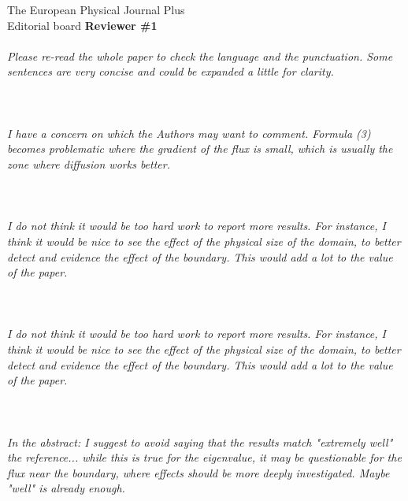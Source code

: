 \documentclass[11pt]{letter} %
\newcommand{\revised}[1]{{\color{red}{#1}}}
\begin{document}
\begin{letter}{The European Physical Journal Plus \\
Editorial board}
\textbf{Reviewer \#1}
\\ \\
\textit{Please re-read the whole paper to check the language and the punctuation. Some sentences are very concise and could be expanded a little for clarity.}
\\ \\
\revised{The manuscript underwent a thorough examination of the language and punctuation, and some sentences were elaborated for clarity. For example, ...}
\\ \\
\textit{I have a concern on which the Authors may want to comment. Formula (3) becomes problematic where the gradient of the flux is small, which is usually the zone where diffusion works better.}
\\ \\
\revised{T}
\\ \\
\textit{I do not think it would be too hard work to report more results. For instance, I think it would be nice to see the effect of the physical size of the domain, to better detect and evidence the effect of the boundary. This would add a lot to the value of the paper.}
\\ \\
\revised{T}
\\ \\
\textit{I do not think it would be too hard work to report more results. For instance, I think it would be nice to see the effect of the physical size of the domain, to better detect and evidence the effect of the boundary. This would add a lot to the value of the paper.}
\\ \\
\revised{T}
\\ \\
\textit{In the abstract: I suggest to avoid saying that the results match "extremely well" the reference... while this is true for the eigenvalue, it may be questionable for the flux near the boundary, where effects should be more deeply investigated. Maybe "well" is already enough.}
\\ \\
\revised{T}
\\ \\


\end{letter}
\end{document}
